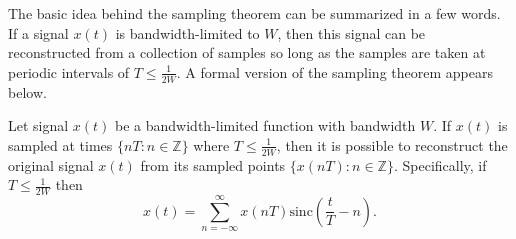 The basic idea behind the sampling theorem can be summarized in a few words.
If a signal $x(t)$ is bandwidth-limited to $W$, then this signal can be reconstructed from a collection of samples so long as the samples are taken at periodic intervals of $T \leq \frac{1}{2W}$.
A formal version of the sampling theorem appears below.

\begin{theorem} \label{theorem:SamplingTheorem}
Let signal $x(t)$ be a bandwidth-limited function with bandwidth $W$.
If $x(t)$ is sampled at times $\{ nT : n \in \mathbb{Z} \}$ where $T \leq \frac{1}{2W}$, then it is possible to reconstruct the original signal $x(t)$ from its sampled points $\{ x(nT) : n \in \mathbb{Z} \}$.
Specifically, if $T \leq \frac{1}{2W}$ then
\begin{equation} \label{equation:SamplingReconstructionFormula}
x(t) = \sum_{n = -\infty}^{\infty}
x(nT) \mathrm{sinc} \left( \frac{t}{T}-n \right) .
\end{equation}
\end{theorem}
